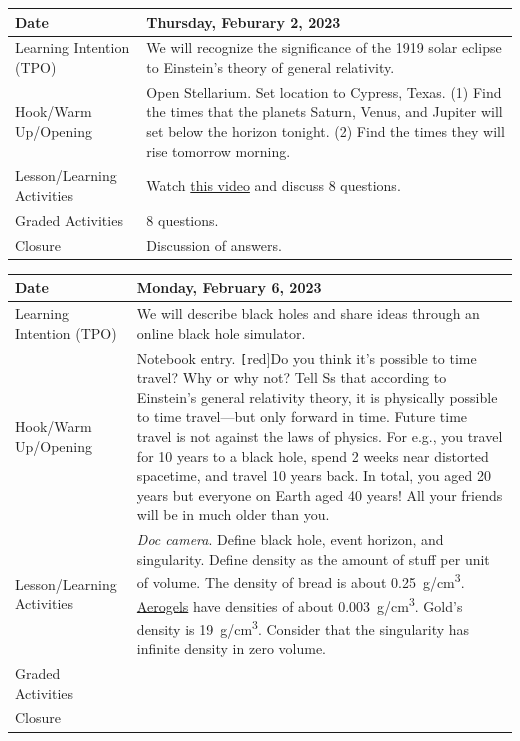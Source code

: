 \documentclass{article}
\numberwithin{equation}{section}
\numberwithin{figure}{section}
\begin{document}
\begin{tabular}{|m{}|m{}|}
    \hline  
    \cellcolor{black!20}\textbf{Date} &
    \cellcolor{black!20}\textbf{Thursday, Feburary 2, 2023} \\
    \hline
    Learning Intention (TPO) & We will recognize the significance of the 1919 solar eclipse to Einstein's theory of general relativity. \\
    \hline
    Hook/Warm Up/Opening & Open Stellarium. Set location to Cypress, Texas. (1) Find the times that the planets Saturn, Venus, and Jupiter will set below the horizon tonight. (2) Find the times they will rise tomorrow morning.\\
    \hline
    Lesson/Learning Activities & Watch \href{https://youtu.be/HLxvq_M4218}{this video} and discuss 8 questions. \\
    \hline
    Graded Activities & 8 questions. \\
    \hline
    Closure & Discussion of answers.\\  
    \hline
\end{tabular}  

\begin{tabular}{|m{}|m{}|}
    \hline  
    \cellcolor{black!20}\textbf{Date} &
    \cellcolor{black!20}\textbf{Monday, February 6, 2023} \\
    \hline
    Learning Intention (TPO) &  We will describe black holes and share ideas through an online black hole simulator.\\
    \hline
    Hook/Warm Up/Opening & Notebook entry. \texttt[red]{Do you think it's possible to time travel? Why or why not?} Tell Ss that according to Einstein's general relativity theory, it is physically possible to time travel---but only forward in time. Future time travel is not against the laws of physics. For e.g., you travel for 10 years to a black hole, spend 2 weeks near distorted spacetime, and travel 10 years back. In total, you aged 20 years but everyone on Earth aged 40 years! All your friends will be in much older than you.\\
    \hline
    Lesson/Learning Activities & \textit{Doc camera}. Define \gls{black hole}, \gls{event horizon}, and \gls{singularity}. Define density as the amount of stuff per unit of volume. The density of bread is about \SI{0.25}{g/cm^3}. \href{https://youtu.be/AeJ9q45PfD0}{Aerogels} have densities of about \SI{0.003}{g/cm^3}. Gold's density is \SI{19}{g/cm^3}. Consider that the singularity has infinite density in zero volume. \\
    \hline
    Graded Activities & \\
    \hline
    Closure & \\  
    \hline
\end{tabular}
\end{document}
